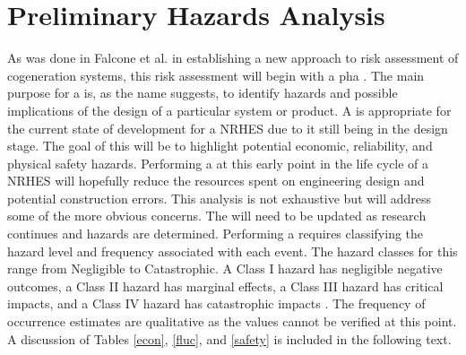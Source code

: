 \section{Preliminary Hazards Analysis}
As was done in Falcone et al. in establishing a new approach to risk assessment of cogeneration systems, this risk assessment will begin with a \ac{pha} \cite{Falcone}. The main purpose for a \cite{pha} is, as the name suggests, to identify hazards and possible implications of the design of a particular system or product.  A \cite{pha} is appropriate for the current state of development for a NRHES due to it still being in the design stage. The goal of this \cite{pha} will be to highlight potential economic, reliability, and physical safety hazards. Performing a \cite{pha} at this early point in the life cycle of a NRHES will hopefully reduce the resources spent on engineering design and potential construction errors. This analysis is not exhaustive but will address some of the more obvious concerns. The \cite{pha} will need to be updated as research continues and hazards are determined.
	Performing a \cite{pha} requires classifying the hazard level and frequency associated with each event. The hazard classes for this \cite{pha} range from Negligible to Catastrophic. A Class I hazard has negligible negative outcomes, a Class II hazard has marginal effects, a Class III hazard has critical impacts, and a Class IV hazard has catastrophic impacts \cite{ostrom2012risk}.  The frequency of occurrence estimates are qualitative as the values cannot be verified at this point. A discussion of Tables \ref{econ}, \ref{fluc}, and \ref{safety} is included in the following text.

